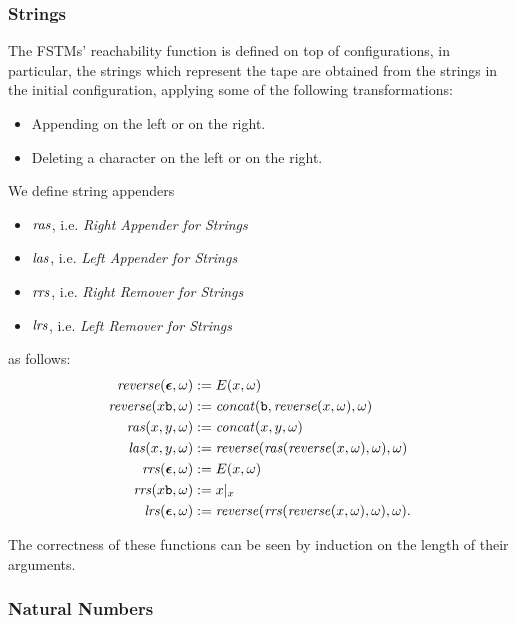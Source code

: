 \subsubsection{Strings}
\label{par:strings}

The FSTMs' reachability function is defined on top of
configurations, in particular, the strings which represent the tape are
obtained from the strings in the initial configuration, applying some of the
following transformations:
%
\begin{itemize}
  \item Appending on the left or on the right.
  \item Deleting a character on the left or on the right.
\end{itemize}
\begin{defn}
  \label{def:apprems}
    We define string appenders
    \begin{itemize}
      \item $\mathit{ras}$, i.e. \emph{Right Appender for Strings}
      \item $\mathit{las}$, i.e. \emph{Left Appender for Strings}
      \item $\mathit{rrs}$, i.e. \emph{Right Remover for Strings}
      \item $\mathit{lrs}$, i.e. \emph{Left Remover for Strings}
    \end{itemize}
    as follows:
    \begin{align*}
      \reverse(\eepsilon, \omega) &:= E(x, \omega)\\
      \reverse(x\bool, \omega) &:= \concat(\bool, \reverse (x, \omega), \omega)\\%
      \ras(x, y, \omega) &:= \concat(x, y, \omega)\\%
      \las(x, y, \omega) &:=  \reverse (\ras(\reverse(x, \omega), \omega), \omega)\\%
      \rrs(\eepsilon,\omega) &:=  E(x, \omega)\\
      \rrs(x\bool, \omega) &:=  x|_{x}\\%
      \lrs(\eepsilon, \omega) &:= \reverse (\rrs(\reverse(x, \omega), \omega), \omega).
    \end{align*}
\end{defn}
\noindent
The correctness of these functions can be seen by induction on the length of their
arguments.

\subsubsection{Natural Numbers}

